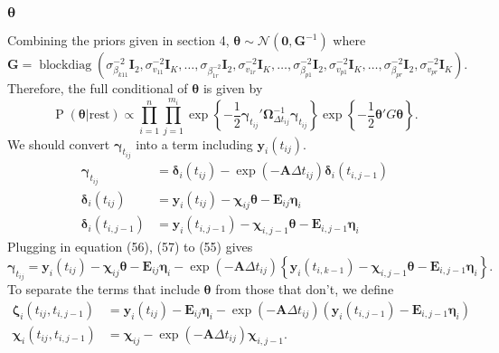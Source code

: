 \documentclass[11pt]{article}
\newcommand{\bs}{\boldsymbol}
\newcommand{\opn}{\operatorname}
\begin{document}
\subsubsection{$\bs{\theta}$}
Combining the priors given in section 4, $\bs{\theta} \sim \mathcal{N}\left(\bs{0},\bs{G}^{-1}\right)$ where
\begin{equation}
  \bs{G}=\opn{blockdiag}\left(\sigma_{\beta_{k11}}^{-2}\bs{I}_{2},\sigma_{v_{11}}^{-2}\bs{I}_{K}, \ldots , \sigma_{\beta_{1r}^{-2}}\bs{I}_{2}, \sigma_{v_{1r}}^{-2}\bs{I}_{K}, \ldots , \sigma_{\beta_{p1}}^{-2}\bs{I}_{2}, \sigma_{v_{p1}}^{-2}\bs{I}_{K}, \ldots , \sigma_{\beta_{pr}}^{-2}\bs{I}_{2}, \sigma_{v_{pr}}^{-2}\bs{I}_{K}\right).
\end{equation}
Therefore, the full conditional of $\bs{\theta}$ is given by
\begin{equation}
  \opn{P}\left(\bs{\theta}|\text{rest}\right) \propto \prod_{i=1}^{n}\prod_{j=1}^{m_{i}}\exp\left\{-\frac{1}{2}\bs{\gamma}_{t_{ij}}'\bs{\Omega}_{\Delta t_{ij}}^{-1}\bs{\gamma}_{t_{ij}} \right\}\exp\left\{-\frac{1}{2}\bs{\theta}'G\bs{\theta} \right\}.
\end{equation}
We should convert $\bs{\gamma}_{t_{ij}}$ into a term including $\bs{y}_{i}\left(t_{ij}\right)$.
\begin{align}
  \bs{\gamma}_{t_{ij}} &= \bs{\delta}_{i}\left(t_{ij}\right) - \exp\left(-\bs{A}\Delta t_{ij}\right)\bs{\delta}_{i}\left(t_{i,j-1}\right)\\
  \bs{\delta}_{i}\left(t_{ij}\right) &= \bs{y}_{i}\left(t_{ij}\right) -\bs{\chi}_{ij}\bs{\theta} - \bs{E}_{ij}\bs{\eta}_{i}\\
  \bs{\delta}_{i}\left(t_{i,j-1}\right) &= \bs{y}_{i}\left(t_{i,j-1}\right) -\bs{\chi}_{i,j-1}\bs{\theta} - \bs{E}_{i,j-1}\bs{\eta}_{i}
\end{align}
Plugging in equation (56), (57) to (55) gives
\begin{equation}
  \bs{\gamma}_{t_{ij}} = \bs{y}_{i}\left(t_{ij}\right) - \bs{\chi}_{ij}\bs{\theta}-\bs{E}_{ij}\bs{\eta}_{i}-\exp\left(-\bs{A}\Delta t_{ij}\right)\left\{\bs{y}_{i}\left(t_{i,k-1}\right) -\bs{\chi}_{i,j-1}\bs{\theta}-\bs{E}_{i,j-1}\bs{\eta}_{i} \right\}.
\end{equation}
To separate the terms that include $\bs{\theta}$ from those that don't, we define
\begin{align}
  \bs{\zeta}_{i}\left(t_{ij}, t_{i,j-1}\right) &= \bs{y}_{i}\left(t_{ij}\right)-\bs{E}_{ij}\bs{\eta}_{i} - \exp\left(-\bs{A}\Delta t_{ij}\right)\left(\bs{y}_{i}\left(t_{i,j-1}\right)-\bs{E}_{i,j-1}\bs{\eta}_{i}\right)\\
  \bs{\chi}_{i}\left(t_{ij},t_{i,j-1}\right) &= \bs{\chi}_{ij} - \exp\left(-\bs{A}\Delta t_{ij}\right)\bs{\chi}_{i,j-1}.
\end{align}
\end{document}
